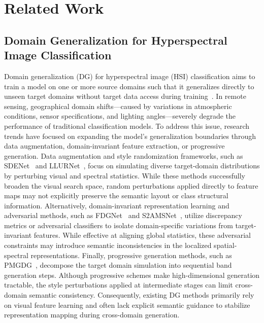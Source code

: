 \section{Related Work}
\label{sec:related}

\subsection{Domain Generalization for Hyperspectral Image Classification}
Domain generalization (DG) for hyperspectral image (HSI) classification aims to train a model on one or more source domains such that it generalizes directly to unseen target domains without target data access during training~\cite{wang2022domain}. In remote sensing, geographical domain shifts—caused by variations in atmospheric conditions, sensor specifications, and lighting angles—severely degrade the performance of traditional classification models. To address this issue, research trends have focused on expanding the model's generalization boundaries through data augmentation, domain-invariant feature extraction, or progressive generation. Data augmentation and style randomization frameworks, such as SDENet~\cite{sdenet2022} and LLURNet~\cite{llurnet2023}, focus on simulating diverse target-domain distributions by perturbing visual and spectral statistics. While these methods successfully broaden the visual search space, random perturbations applied directly to feature maps may not explicitly preserve the semantic layout or class structural information. Alternatively, domain-invariant representation learning and adversarial methods, such as FDGNet~\cite{fdgnet2022} and S2AMSNet~\cite{s2amsnet2022}, utilize discrepancy metrics or adversarial classifiers to isolate domain-specific variations from target-invariant features. While effective at aligning global statistics, these adversarial constraints may introduce semantic inconsistencies in the localized spatial-spectral representations. Finally, progressive generation methods, such as PMGDG~\cite{li2022progressive}, decompose the target domain simulation into sequential band generation steps. Although progressive schemes make high-dimensional generation tractable, the style perturbations applied at intermediate stages can limit cross-domain semantic consistency. Consequently, existing DG methods primarily rely on visual feature learning and often lack explicit semantic guidance to stabilize representation mapping during cross-domain generation.

